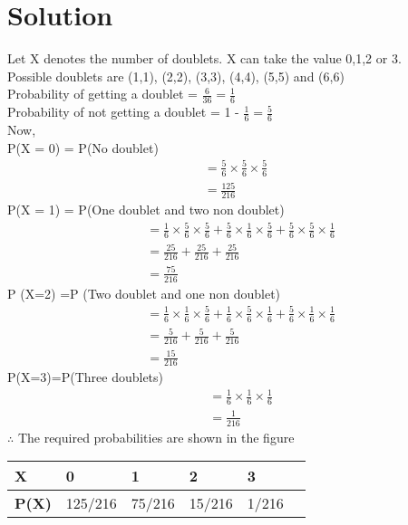 \documentclass[journal,12pt,twocolumn]{IEEEtran}
\begin{document}
\section{Solution}
Let X denotes the number of doublets. X can take the value 0,1,2 or 3.\\
Possible doublets are (1,1), (2,2), (3,3), (4,4), (5,5) and (6,6)\\
Probability of getting a doublet = $\frac{6}{36} = \frac{1}{6}$\\
Probability of not getting a doublet = 1 - $\frac{1}{6} = \frac{5}{6}$\\
Now, \\
    P(X = 0) = P(No doublet)
\begin{align}
= \frac{5}{6} \times \frac{5}{6} \times \frac{5}{6}\\
= \frac{125}{216}
\end{align}
P(X = 1) = P(One doublet and two non doublet)
\begin{align}
    &= \frac{1}{6} \times \frac{5}{6} \times \frac{5}{6} + \frac{5}{6} \times \frac{1}{6} \times \frac{5}{6} + \frac{5}{6} \times \frac{5}{6} \times \frac{1}{6}\\
             &= \frac{25}{216} + \frac{25}{216} + \frac{25}{216}\\
             &= \frac{75}{216}
\end{align}
P (X=2) =P (Two doublet and one non doublet)\\
\begin{align}
    &= \frac{1}{6} \times \frac{1}{6} \times \frac{5}{6} + \frac{1}{6} \times \frac{5}{6} \times \frac{1}{6} + \frac{5}{6} \times \frac{1}{6} \times \frac{1}{6}\\
             &= \frac{5}{216} + \frac{5}{216} + \frac{5}{216}\\
             &= \frac{15}{216}
\end{align}
P(X=3)=P(Three doublets)\\
\begin{align}
    &= \frac{1}{6} \times \frac{1}{6} \times \frac{1}{6}\\
             &= \frac{1}{216} 
\end{align}
$\therefore$ The required probabilities are shown in the figure\\
\begin{table}[ht]
\begin{tabular}{|l|l|l|l|l|l|}
\hline
\textbf{X}    & 0   & 1   & 2   & 3    \\ \hline
\textbf{P(X)} & 125/216 & 75/216 & 15/216 & 1/216  \\ \hline
\end{tabular}
\end{table}
\end{document}
